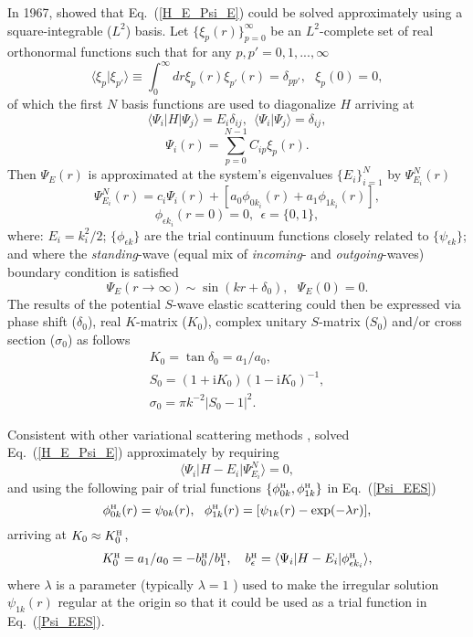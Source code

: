 \documentclass[aip
, pra
, showpacs
, aps
, twocolumn
, groupedaddress
, floatfix
]{revtex4}
\newcommand{\beq}{\begin{equation}}
\newcommand{\eeq}{\end{equation}}
\newcommand{\barr}{\begin{array}}
\newcommand{\earr}{\end{array}}
\newcommand{\phiH}{\phi^{\mbox{\tiny{H}}}}
\begin{document}
In 1967, \citet{Harris67} showed that Eq.~(\ref{H_E_Psi_E}) could be solved
approximately using a square-integrable ($L^2$) basis.
Let $\{\xi_p(r)\}_{p=0}^\infty$ be an $L^2$-complete set of real orthonormal functions
such that for any $p,p'=0,1,...,\infty$
\beq
\langle \xi_p | \xi_{p'} \rangle \equiv \int_0^\infty dr \xi_p(r) \xi_{p'}(r) =\delta_{pp'}, \ \ \ \xi_p(0)=0,
\eeq
of which the first $N$ basis functions are used to diagonalize $H$ arriving at
\beq
\langle \Psi_i |H| \Psi_j \rangle = E_i \delta_{ij} , \ \ \langle \Psi_i | \Psi_j \rangle=\delta_{ij},
\eeq
\beq
\Psi_i(r) = \sum_{p=0}^{N-1} C_{ip} \xi_p(r).
\eeq
Then $\Psi_E(r)$ is approximated at the system's eigenvalues $\{E_i\}_{i=1}^{N}$ by $\Psi^N_{E_i}(r)$
\cite{Harris67}
\beq
\Psi^N_{E_i}(r) = c_i \Psi_i(r)  + [a_0 \phi_{0k_i}(r)  + a_1 \phi_{1k_i}(r)],
\label{Psi_EES} \eeq
\beq
\phi_{\epsilon k_i}(r=0) = 0, \ \ \epsilon = \{0,1\},
\eeq
where: $E_i=k_i^2/2$; $\{\phi_{\epsilon k}\}$ are the trial continuum functions closely related to $\{\psi_{\epsilon k}\}$; and where the {\em standing}-wave (equal mix of {\em incoming}- and {\em outgoing}-waves) boundary condition is satisfied
\beq
\Psi_E(r \rightarrow \infty) \sim  \sin(kr+\delta_0), \ \ \ \Psi_E(0)=0.   \label{stand_wave}
\eeq
The results of the potential $S$-wave elastic scattering could then be expressed via
phase shift ($\delta_0$), real $K$-matrix ($K_0$), complex unitary $S$-matrix ($S_{0}$) and/or cross section ($\sigma_{0}$)
as follows
\beq \barr{l}
K_{0} = \tan{\delta_0} = a_1 / a_0,\\
S_{0}=(1+\mbox{i}K_0)(1-\mbox{i}K_0)^{-1}, \\
\sigma_{0}=\pi k^{-2} |S_{0}-1|^2.
\earr \eeq


Consistent with other variational scattering methods \cite{Nesbet68},
\citet{Harris67} solved Eq.~(\ref{H_E_Psi_E}) approximately by requiring
\beq
\langle\Psi_i|H-E_i|\Psi^N_{E_i}\rangle=0,  \label{EES_ONE_C1}
\eeq
and using the following pair of trial functions $\{\phiH_{0k}, \phiH_{1k} \}$ in
Eq.~(\ref{Psi_EES})
\beq
\phiH_{0k}(r) =  \psi_{0k}(r),\ \
\phiH_{1k}(r) =  [\psi_{1k}(r) -  \exp(-\lambda r)],
\label{def_phi_H} \eeq
arriving at $K_0\approx K^{\mbox{\tiny{H}}}_{0}$,
\beq \barr{l}
K^{\mbox{\tiny{H}}}_{0} = a_1 / a_0 = - b^{\mbox{\tiny{H}}}_{0} / b^{\mbox{\tiny{H}}}_{1}, \ \ \
b^{\mbox{\tiny{H}}}_{\epsilon} = \langle\Psi_i|H-E_i|  \phiH_{\epsilon k_i} \rangle,
\earr \label{K_0_Harris} \eeq
where $\lambda$ is a parameter (typically $\lambda=1$ \cite{Nesbet68}) used to make the irregular solution $\psi_{1k}(r)$ regular
at the origin so that it could be used as a trial function in Eq.~(\ref{Psi_EES}).
\end{document}

